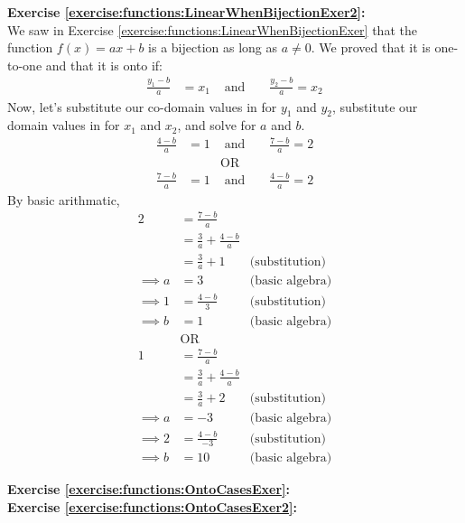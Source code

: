 \noindent\textbf{Exercise \ref{exercise:functions:LinearWhenBijectionExer2}:}\\ %
We saw in Exercise \ref{exercise:functions:LinearWhenBijectionExer} that the function $f(x) = ax + b$ is a bijection as long as $a\neq 0$. We proved that it is one-to-one and that it is onto if: 
\begin{align*}
\frac{y_{1} - b}{a} &= x_{1} &\text{\ and\ }& &\frac{y_{2} - b}{a} = x_{2}
\end{align*}
Now, let's substitute our co-domain values in for $y_{1}$ and $y_{2}$, substitute our domain values in for $x_{1}$ and $x_{2}$, and solve for $a$ and $b$.
\begin{align*}
\frac{4 - b}{a} &= 1 &\text{\ and\ }& &\frac{7 - b}{a} = 2\\
&&\text{OR}\\
\frac{7 - b}{a} &= 1 &\text{\ and\ }& &\frac{4 - b}{a} = 2
\end{align*}
By basic arithmatic,
\begin{align*}
2 &= \frac{7 - b}{a}\\
&= \frac{3}{a} + \frac{4 - b}{a} \\
&= \frac{3}{a} + 1 &\text{(substitution)}\\
\implies a &= 3 &\text{(basic algebra)}\\
\implies 1 &= \frac{4 - b}{3} &\text{(substitution)}\\
\implies b &= 1 &\text{(basic algebra)}\\
&\text{OR}\\
1 &= \frac{7 - b}{a}\\
&= \frac{3}{a} + \frac{4 - b}{a} \\
&= \frac{3}{a} + 2 &\text{(substitution)}\\
\implies a &= -3 &\text{(basic algebra)}\\
\implies 2 &= \frac{4 - b}{-3} &\text{(substitution)}\\
\implies b &= 10 &\text{(basic algebra)}
\end{align*}


\noindent\textbf{Exercise \ref{exercise:functions:OntoCasesExer}:}\\ 

\noindent\textbf{Exercise \ref{exercise:functions:OntoCasesExer2}:}\\   

